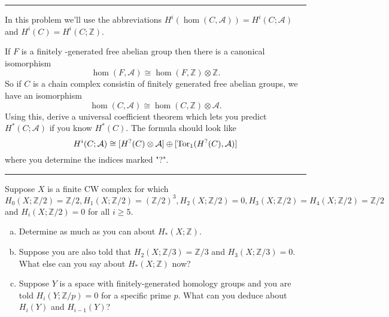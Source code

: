 \documentclass[a4paper, 12pt]{article}
\begin{document}
\noindent\rule{7in}{2.8pt}
\begin{problem}{3.8}
In this problem we'll use the abbreviations \(H^i(\hom(C,\mathcal{A}))=H^i(C;\mathcal{A})\) and \(H^i(C)=H^i(C;\mathbb{Z})\). 
\par 
If \(F\) is a finitely -generated free abelian group then there is a canonical isomorphism 
\[\hom(F,\mathcal{A})\cong \hom(F,\mathbb{Z})\otimes \mathbb{Z}.\]
So if \(C\) is a chain complex consistin of finitely generated free abelian groups, we have an isomorphism 
\[\hom(C,\mathcal{A})\cong \hom(C,\mathbb{Z})\otimes \mathcal{A}.\]
Using this, derive a universal coefficient theorem which lets you predict \(H^*(C;\mathcal{A})\) if you know \(H^*(C)\). The formula should look like 
\[H^i(C;\mathcal{A})\cong [H^?(C)\otimes \mathcal{A}]\oplus [\text{Tor}_1(H^?(C),\mathcal{A})]\]
where you determine the indices marked "?".
\end{problem}
\begin{solution}
    
\end{solution}


\noindent\rule{7in}{2.8pt}
\begin{problem}{4}
Suppose \(X\) is a finite CW complex for which 
\[H_0(X;\mathbb{Z}/2)=\mathbb{Z}/2, H_1(X;\mathbb{Z}/2)=(\mathbb{Z}/2)^3, H_2(X;\mathbb{Z}/2)=0, H_3(X;\mathbb{Z}/2)=H_4(X;\mathbb{Z}/2)=\mathbb{Z}/2\] 
and \(H_i(X;\mathbb{Z}/2)=0\) for all \(i\geq 5\).
\begin{enumerate}[(a)]
\item Determine as much as you can about \(H_*(X;\mathbb{Z})\).
\item Suppose you are also told that \(H_2(X;\mathbb{Z}/3)=\mathbb{Z}/3\) and \(H_3(X;\mathbb{Z}/3)=0\). What else can you say about \(H_*(X;\mathbb{Z})\) now? 
\item Suppose \(Y\) is a space with finitely-generated homology groups and you are told \(H_i(Y;\mathbb{Z}/p)=0\) for a specific prime \(p\). What can you deduce about \(H_i(Y)\) and \(H_{i-1}(Y)\)? 
\end{enumerate}
\end{problem}
\begin{solution}

\end{solution}
\end{document}
